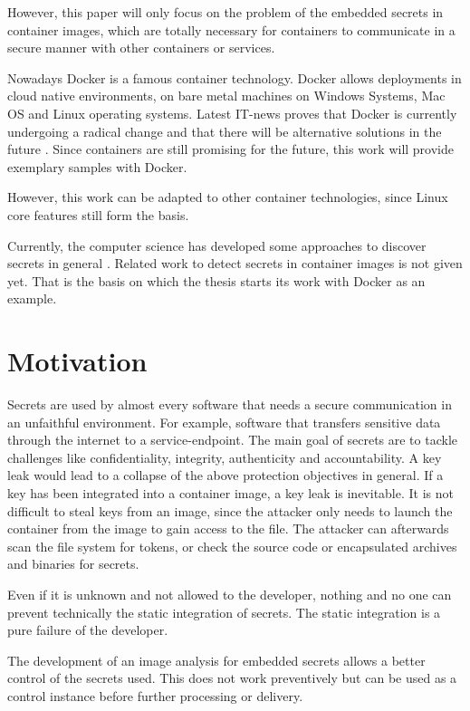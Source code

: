 However, this paper will only focus on the problem of the embedded secrets in container images, which are totally necessary for containers to communicate in a secure manner with other containers or services.

Nowadays Docker is a famous container technology. Docker allows deployments in cloud native environments, on bare metal machines on Windows Systems, Mac OS and Linux operating systems. 
Latest IT-news proves that Docker is currently undergoing a radical change and that there will be alternative solutions in the future \cite{docker_heise}. Since containers are still promising for the future, this work will provide exemplary samples with Docker.

However, this work can be adapted to other container technologies, since Linux core features still form the basis.

Currently, the computer science has developed some approaches to discover secrets in general \cite{7180102}. Related work to detect secrets in container images is not given yet.
That is the basis on which the thesis starts its work with Docker as an example.

%
%
\section{Motivation}
\label{sec:intro:motivation}
Secrets are used by almost every software that needs a secure communication in an unfaithful environment. For example, software that transfers sensitive data through the internet to a service-endpoint. The main goal of secrets are to tackle challenges like confidentiality, integrity, authenticity and accountability. A key leak would lead to a collapse of the above protection objectives in general.
If a key has been integrated into a container image, a key leak is inevitable.
It is not difficult to steal keys from an image, since the attacker only needs to launch the container from the image to gain access to the file. The attacker can afterwards scan the file system for tokens, or check the source code or encapsulated archives and binaries for secrets. 

Even if it is unknown and not allowed to the developer, nothing and no one can prevent technically the static integration of secrets. The static integration is a pure failure of the developer.

The development of an image analysis for embedded secrets allows a better control of the secrets used. This does not work preventively but can be used as a control instance before further processing or delivery. 
%
%
